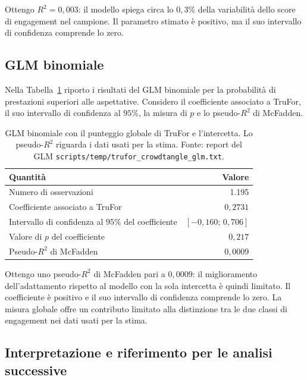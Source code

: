 Ottengo $R^2=0{,}003$: il modello spiega circa lo $0{,}3\%$ della variabilità dello score di engagement nel campione. Il parametro stimato è positivo, ma il suo intervallo di confidenza comprende lo zero.

\subsection{GLM binomiale}
\label{subsec:risultati-trufor-glm}

Nella Tabella~\ref{tab:risultati-trufor-glm} riporto i risultati del GLM binomiale per la probabilità di prestazioni superiori alle aspettative. Considero il coefficiente associato a TruFor, il suo intervallo di confidenza al $95\%$, la misura di $p$ e lo pseudo-$R^2$ di McFadden.

\begin{table}[htbp]
    \centering
    \small
    \caption{GLM binomiale con il punteggio globale di TruFor e l'intercetta. Lo pseudo-$R^2$ riguarda i dati usati per la stima. Fonte: report del GLM \texttt{scripts/temp/trufor\_crowdtangle\_glm.txt}.}
    \label{tab:risultati-trufor-glm}
    \begin{tabular}{@{}lr@{}}
        \toprule
        Quantità & Valore \\
        \midrule
        Numero di osservazioni & 1.195 \\
        Coefficiente associato a TruFor & $0{,}2731$ \\
        Intervallo di confidenza al $95\%$ del coefficiente & $[-0{,}160;\,0{,}706]$ \\
        Valore di $p$ del coefficiente & $0{,}217$ \\
        Pseudo-$R^2$ di McFadden & $0{,}0009$ \\
        \bottomrule
    \end{tabular}
\end{table}

Ottengo uno pseudo-$R^2$ di McFadden pari a $0{,}0009$: il miglioramento dell'adattamento rispetto al modello con la sola intercetta è quindi limitato. Il coefficiente è positivo e il suo intervallo di confidenza comprende lo zero. La misura globale offre un contributo limitato alla distinzione tra le due classi di engagement nei dati usati per la stima.

\subsection{Interpretazione e riferimento per le analisi successive}
\label{subsec:risultati-trufor-riferimento}

